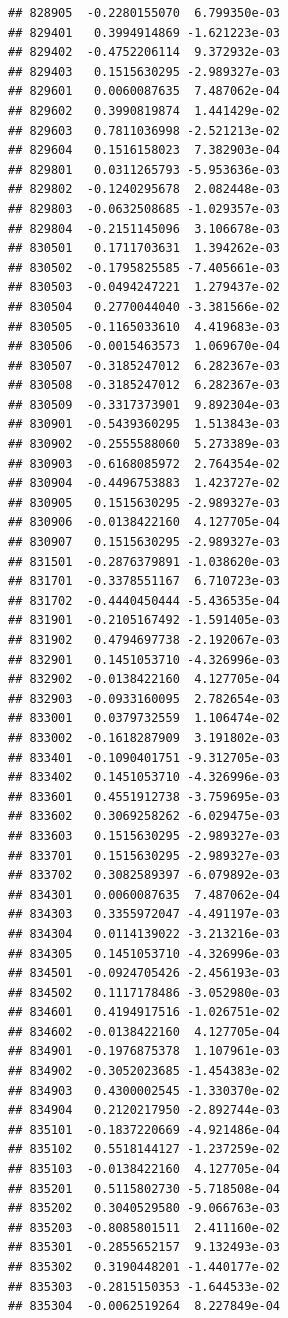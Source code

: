 \documentclass[ignorenonframetext,]{beamer}
\begin{document}
\begin{frame}[fragile]
\begin{verbatim}
## 828905  -0.2280155070  6.799350e-03
## 829401   0.3994914869 -1.621223e-03
## 829402  -0.4752206114  9.372932e-03
## 829403   0.1515630295 -2.989327e-03
## 829601   0.0060087635  7.487062e-04
## 829602   0.3990819874  1.441429e-02
## 829603   0.7811036998 -2.521213e-02
## 829604   0.1516158023  7.382903e-04
## 829801   0.0311265793 -5.953636e-03
## 829802  -0.1240295678  2.082448e-03
## 829803  -0.0632508685 -1.029357e-03
## 829804  -0.2151145096  3.106678e-03
## 830501   0.1711703631  1.394262e-03
## 830502  -0.1795825585 -7.405661e-03
## 830503  -0.0494247221  1.279437e-02
## 830504   0.2770044040 -3.381566e-02
## 830505  -0.1165033610  4.419683e-03
## 830506  -0.0015463573  1.069670e-04
## 830507  -0.3185247012  6.282367e-03
## 830508  -0.3185247012  6.282367e-03
## 830509  -0.3317373901  9.892304e-03
## 830901  -0.5439360295  1.513843e-03
## 830902  -0.2555588060  5.273389e-03
## 830903  -0.6168085972  2.764354e-02
## 830904  -0.4496753883  1.423727e-02
## 830905   0.1515630295 -2.989327e-03
## 830906  -0.0138422160  4.127705e-04
## 830907   0.1515630295 -2.989327e-03
## 831501  -0.2876379891 -1.038620e-03
## 831701  -0.3378551167  6.710723e-03
## 831702  -0.4440450444 -5.436535e-04
## 831901  -0.2105167492 -1.591405e-03
## 831902   0.4794697738 -2.192067e-03
## 832901   0.1451053710 -4.326996e-03
## 832902  -0.0138422160  4.127705e-04
## 832903  -0.0933160095  2.782654e-03
## 833001   0.0379732559  1.106474e-02
## 833002  -0.1618287909  3.191802e-03
## 833401  -0.1090401751 -9.312705e-03
## 833402   0.1451053710 -4.326996e-03
## 833601   0.4551912738 -3.759695e-03
## 833602   0.3069258262 -6.029475e-03
## 833603   0.1515630295 -2.989327e-03
## 833701   0.1515630295 -2.989327e-03
## 833702   0.3082589397 -6.079892e-03
## 834301   0.0060087635  7.487062e-04
## 834303   0.3355972047 -4.491197e-03
## 834304   0.0114139022 -3.213216e-03
## 834305   0.1451053710 -4.326996e-03
## 834501  -0.0924705426 -2.456193e-03
## 834502   0.1117178486 -3.052980e-03
## 834601   0.4194917516 -1.026751e-02
## 834602  -0.0138422160  4.127705e-04
## 834901  -0.1976875378  1.107961e-03
## 834902  -0.3052023685 -1.454383e-02
## 834903   0.4300002545 -1.330370e-02
## 834904   0.2120217950 -2.892744e-03
## 835101  -0.1837220669 -4.921486e-04
## 835102   0.5518144127 -1.237259e-02
## 835103  -0.0138422160  4.127705e-04
## 835201   0.5115802730 -5.718508e-04
## 835202   0.3040529580 -9.066763e-03
## 835203  -0.8085801511  2.411160e-02
## 835301  -0.2855652157  9.132493e-03
## 835302   0.3190448201 -1.440177e-02
## 835303  -0.2815150353 -1.644533e-02
## 835304  -0.0062519264  8.227849e-04

\end{verbatim}
\end{frame}
\end{document}
